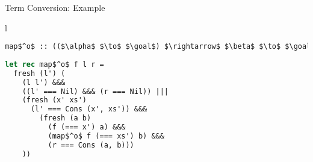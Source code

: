 \documentclass{beamer}
\newcommand{\goal}{\mathfrak G}
\theoremstyle{definition}
\begin{document}
\begin{comment}
\begin{frame}[fragile]{Term Conversion: Example}
    \begin{center}    
    \begin{tabular}{l}
    \begin{lstlisting}[mathescape=true,language=ocaml]
map$^o$ :: (($\alpha$ $\to$ $\goal$) $\rightarrow$ $\beta$ $\to$ $\goal$) $\rightarrow$ ($\alpha$ list $\to$ $\goal$) $\rightarrow$ $\beta$ list $\to$ $\goal$    
    
let rec map$^o$ f l r =
  fresh (l') (
    (l l') &&&
    ((l' === Nil) &&& ((=== Nil) r)) |||
    (fresh (x' xs')
      (l' === Cons (x', xs')) &&&
      (funx xs q -> 
        (fresh (a b)
          (f x a) &&&
          (map$^o$ f xs b) &&&
          (q === Cons (a, b))))
      (=== x') (=== xs') r))
     
    \end{lstlisting}
    \end{tabular}
    \end{center}
\end{frame}
\end{comment}

\begin{frame}[fragile]{Term Conversion: Example}
    \begin{center}
    \begin{tabular}{l}
    \begin{lstlisting}[mathescape=true,language=ocaml]
map$^o$ :: (($\alpha$ $\to$ $\goal$) $\rightarrow$ $\beta$ $\to$ $\goal$) $\rightarrow$ ($\alpha$ list $\to$ $\goal$) $\rightarrow$ $\beta$ list $\to$ $\goal$    
    
let rec map$^o$ f l r =
  fresh (l') (
    (l l') &&&
    ((l' === Nil) &&& (r === Nil)) |||
    (fresh (x' xs')
      (l' === Cons (x', xs')) &&&   
        (fresh (a b)
          (f (=== x') a) &&&
          (map$^o$ f (=== xs') b) &&&
          (r === Cons (a, b)))
    ))
     
    \end{lstlisting}
    \end{tabular}
    \end{center}
\end{frame}

\end{document}

